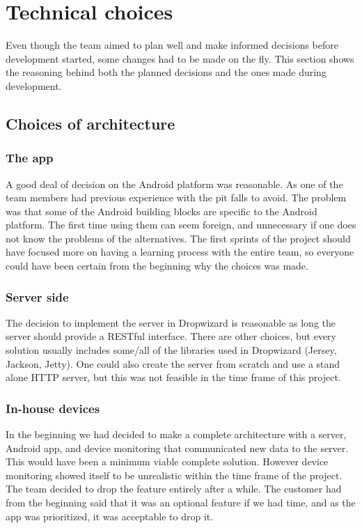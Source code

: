 \section{Technical choices}
Even though the team aimed to plan well and make informed decisions before development started, some changes had to be made on the fly. This section shows the reasoning behind both the planned decisions and the ones made during development.

\subsection{Choices of architecture}

\subsubsection{The app}

A good deal of decision on the Android platform was reasonable. As one of the team members had previous experience with the pit falls to avoid. The problem was that some of the Android building blocks are specific to the Android platform. The first time using them can seem foreign, and unnecessary if one does not know the problems of the alternatives. The first sprints of the project should have focused more on having a learning process with the entire team, so everyone could have been certain from the beginning why the choices was made.

\subsubsection{Server side}

The decision to implement the server in Dropwizard is reasonable as long the server should provide a RESTful interface. There are other choices, but every solution usually includes some/all of the libraries used in Dropwizard (Jersey, Jackson, Jetty). One could also create the server from scratch and use a stand alone HTTP server, but this was not feasible in the time frame of this project. 

\subsubsection{In-house devices}

In the beginning we had decided to make a complete architecture with a server, Android app, and device monitoring that communicated new data to the server. This would have been a minimum viable complete solution. However device monitoring showed itself to be unrealistic within the time frame of the project. The team decided to drop the feature entirely after a while. The customer had from the beginning said that it was an optional feature if we had time, and as the app was prioritized, it was acceptable to drop it.


